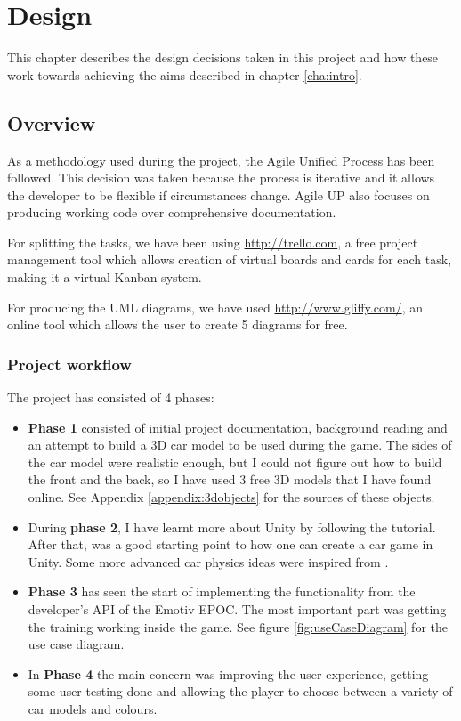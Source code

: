 \chapter{Design}
\label{cha:design}

This chapter describes the design decisions taken in this project and how these work towards achieving the aims described in chapter \ref{cha:intro}.

\section{Overview}
As a methodology used during the project, the Agile Unified Process has been followed. This decision was taken because the process is iterative and it allows the developer to be flexible if circumstances change. Agile UP also focuses on producing working code over comprehensive documentation.

For splitting the tasks, we have been using \url{http://trello.com}, a free project management tool which allows creation of virtual boards and cards for each task, making it a virtual Kanban system.

For producing the UML diagrams, we have used \url{http://www.gliffy.com/}, an online tool which allows the user to create 5 diagrams for free.

\subsection{Project workflow}
The project has consisted of 4 phases:
\begin{itemize}
	\item \textbf{Phase 1} consisted of initial project documentation, background reading and an attempt to build a 3D car model to be used during the game. The sides of the car model were realistic enough, but I could not figure out how to build the front and the back, so I have used 3 free 3D models that I have found online. See Appendix \ref{appendix:3dobjects} for the sources of these objects.
	\item During \textbf{phase 2}, I have learnt more about Unity by following the \cite{walkerboys} tutorial. After that, \cite{flattutorials} was a good starting point to how one can create a car game in Unity. Some more advanced car physics ideas were inspired from \cite{carphysics}.
	\item \textbf{Phase 3} has seen the start of implementing the functionality from the developer's API of the Emotiv EPOC. The most important part was getting the training working inside the game. See figure \ref{fig:useCaseDiagram} for the use case diagram.
	\item In \textbf{Phase 4} the main concern was improving the user experience, getting some user testing done and allowing the player to choose between a variety of car models and colours.
\end{itemize}


